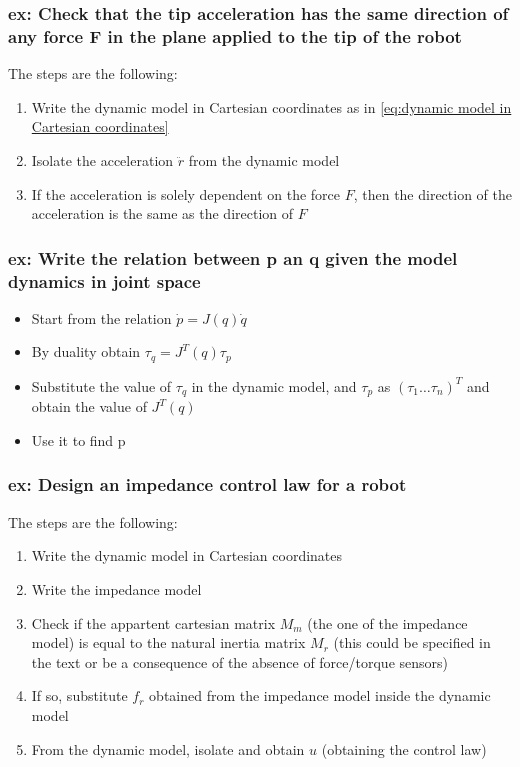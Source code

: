 \documentclass[a4paper,12pt]{article}
\begin{document}
\subsubsection{ex: Check that the tip acceleration
 has the same direction of any force F 
in the plane applied to the tip of the robot}
The steps are the following:
\begin{enumerate}
    \item Write the dynamic model in Cartesian coordinates as in \ref{eq:dynamic model in Cartesian coordinates}
    \item Isolate the acceleration $\ddot{r}$ from the dynamic model
    \item If the acceleration is solely dependent on the force $F$,
     then the direction of the acceleration is the same as 
     the direction of $F$
\end{enumerate}
\subsubsection{ex: Write the relation between p an q given the
model dynamics in joint space}\begin{itemize}
\item Start from the relation $\dot{p}=J(q)\dot{q}$
\item By duality obtain $\tau_q=J^T(q)\tau_p$
\item Substitute the value of $\tau_q$ in the dynamic model,
and $\tau_p$ as $(\tau_1 \dots \tau_n)^T$ and obtain 
the value of $J^T(q)$
\item Use it to find p
\end{itemize}
\subsubsection{ex: Design an impedance control law for a robot}\label{sec:ex: design an impedance control law for a robot}
The steps are the following:
\begin{enumerate}
    \item Write the dynamic model in Cartesian coordinates
    \item Write the impedance model 
    \item Check if the appartent cartesian matrix $M_m$ (the one of the 
    impedance model) is equal to the natural inertia matrix $M_r$ 
    (this could be specified in the text or be a consequence of the absence of 
    force/torque sensors)
    \item If so, substitute $f_r$ obtained from the impedance model inside the 
    dynamic model
    \item From the dynamic model, isolate and obtain $u$ (obtaining the control law)
\end{enumerate}
\end{document}
